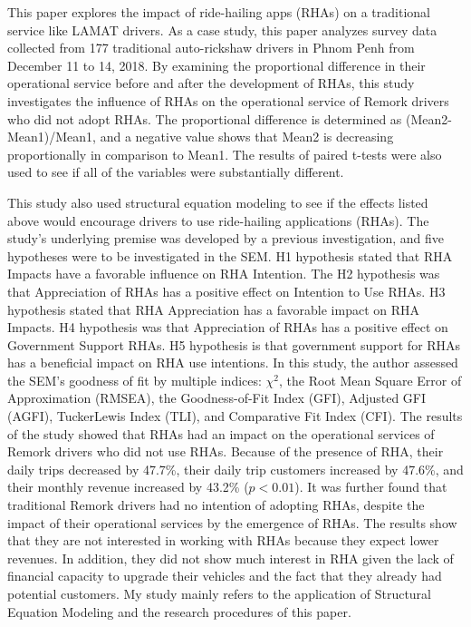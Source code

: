 This paper explores the impact of ride-hailing apps (RHAs) on a traditional service like LAMAT drivers. As a case study, this paper analyzes survey data collected from 177 traditional auto-rickshaw drivers in Phnom Penh from December 11 to 14, 2018. By examining the proportional difference in their operational service before and after the development of RHAs, this study investigates the influence of RHAs on the operational service of Remork drivers who did not adopt RHAs. The proportional difference is determined as (Mean2-Mean1)/Mean1, and a negative value shows that Mean2 is decreasing proportionally in comparison to Mean1. The results of paired t-tests were also used to see if all of the variables were substantially different. 

This study also used structural equation modeling to see if the effects listed above would encourage drivers to use ride-hailing applications (RHAs). The study's underlying premise was developed by a previous investigation, and five hypotheses were to be investigated in the SEM. H1 hypothesis stated that RHA Impacts have a favorable influence on RHA Intention. The H2 hypothesis was that Appreciation of RHAs has a positive effect on Intention to Use RHAs. H3 hypothesis stated that RHA Appreciation has a favorable impact on RHA Impacts. H4 hypothesis was that Appreciation of RHAs has a positive effect on Government Support RHAs. H5 hypothesis is that government support for RHAs has a beneficial impact on RHA use intentions. In this study, the author assessed the SEM's goodness of fit by multiple indices: $\chi^2$, the Root Mean Square Error of Approximation (RMSEA), the Goodness-of-Fit Index (GFI), Adjusted GFI (AGFI), TuckerLewis Index (TLI), and Comparative Fit Index (CFI). The results of the study showed that RHAs had an impact on the operational services of Remork drivers who did not use RHAs. Because of the presence of RHA, their daily trips decreased by 47.7\%, their daily trip customers increased by 47.6\%, and their monthly revenue increased by 43.2\% ($p<0.01$). It was further found that traditional Remork drivers had no intention of adopting RHAs, despite the impact of their operational services by the emergence of RHAs. The results show that they are not interested in working with RHAs because they expect lower revenues. In addition, they did not show much interest in RHA given the lack of financial capacity to upgrade their vehicles and the fact that they already had potential customers. My study mainly refers to the application of Structural Equation Modeling and the research procedures of this paper.



